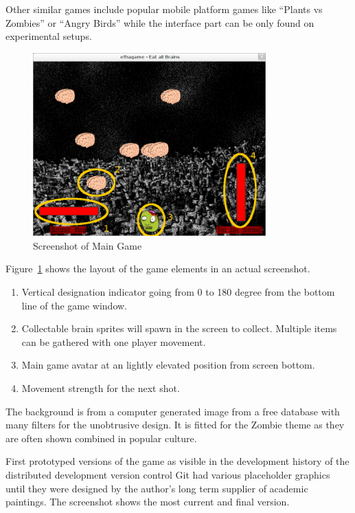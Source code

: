 \documentclass[bibtotocnumbered, headsepline,normalheadings,12pt]{report}
\begin{document}
Other similar games include popular mobile platform games like ``Plants vs Zombies'' or ``Angry Birds'' while the interface part can be only found on
experimental setups.

\begin{figure}[H]
    \centering
    \includegraphics[width=0.8\textwidth]{game.png}%
    \caption{Screenshot of Main Game}
    \label{fig:screenshot}%
\end{figure}

Figure~\ref{fig:screenshot} shows the layout of the game elements in an actual screenshot.

\begin{enumerate}
\item Vertical designation indicator going from 0 to 180 degree from the bottom line of the game window.
\item Collectable brain sprites will spawn in the screen to collect. Multiple items can be gathered with one player movement.
\item Main game avatar at an lightly elevated position from screen bottom.
\item Movement strength for the next shot.
\end{enumerate}

The background is from a computer generated image from a free database with many filters for the unobtrusive design. It is fitted for the
Zombie theme as they are often shown combined in popular culture.

First prototyped versions of the game as visible in the development history of the distributed development version control Git had various placeholder graphics
until they were designed by the author's long term supplier of academic paintings. The screenshot shows the most current and final version.
\end{document}
